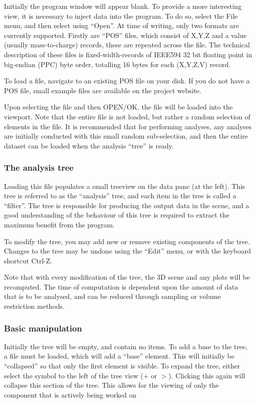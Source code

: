 \documentclass[10pt]{article}
\begin{document}
Initially the program window will appear blank. To provide a more interesting view, it is necessary to inject data into the program.  To do so, select the File menu, and then select using ``Open''. At time of writing, only two formats are currently supported. Firstly are ``POS'' files, which consist of X,Y,Z and a value (usually mass-to-charge) records, these are repeated across the file. The technical description of these files is fixed-width-records of IEEE594 32 bit floating point in big-endian (PPC) byte order, totalling 16 bytes for each (X,Y,Z,V) record.  

To load a file, navigate to an existing POS file on your disk. If you do not have a POS file, small example files are available on the project website.  

Upon selecting the file and then OPEN/OK, the file will be loaded into the viewport. Note that the entire file is not loaded, but rather a random selection of elements in the file. It is recommended that for performing analyses, any analyses are initially conducted with this small random sub-selection, and then the entire dataset can be loaded when the analysis ``tree'' is ready. 
\subsubsection{The analysis tree}


Loading this file populates a small treeview on the data pane (at the left). This tree is referred to as the ``analysis'' tree, and each item in the tree is called a ``filter''. The tree is responsible for producing the output data in the scene, and a good understanding of the behaviour of this tree is required to extract the maximum benefit from the program.  
 
To modify the tree, you may add new or remove existing components of the tree. Changes to the tree may be undone using the ``Edit'' menu, or with the keyboard shortcut Ctrl-Z.  

Note that with every modification of the tree, the 3D scene and any plots will be recomputed. The time of computation is dependent upon the amount of data that is to be analysed, and can be reduced through sampling or volume restriction methods. 
\subsubsection{Basic manipulation}


Initially the tree will be empty, and contain no items. To add a base to the tree, a file must be loaded, which will add a ``base'' element. This will initially be ``collapsed'' so that only the first element is visible. To expand the tree, either select the symbol to the left of the tree view (+ or $>$). Clicking this again will collapse this section of the tree. This allows for the viewing of only the component that is actively being worked on  
\end{document}
